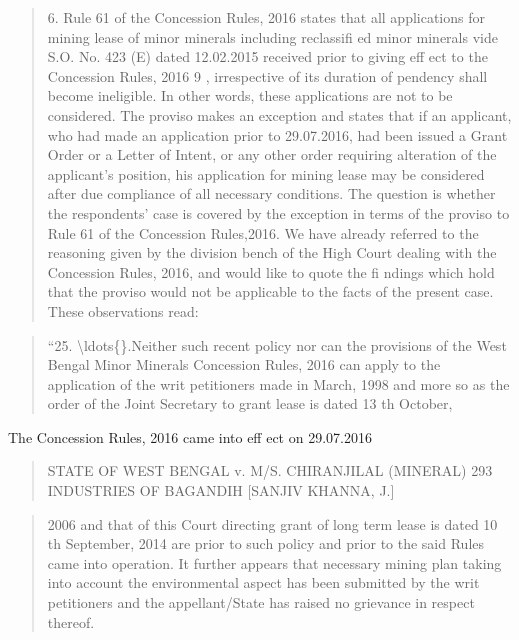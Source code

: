 \documentclass[12pt,a4paper]{article}
\newenvironment{judgequote}
  {\begin{quote}\small}
  {\end{quote}}
\begin{document}
\begin{judgequote}
6. Rule 61 of the Concession Rules, 2016 states that all applications
for mining lease of minor minerals including reclassifi ed minor minerals
vide S.O. No. 423 (E) dated 12.02.2015 received prior to giving eff ect
to the Concession Rules, 2016 9 , irrespective of its duration of pendency
shall become ineligible. In other words, these applications are not to be
considered. The proviso makes an exception and states that if an applicant,
who had made an application prior to 29.07.2016, had been issued a Grant
Order or a Letter of Intent, or any other order requiring alteration of the
applicant's position, his application for mining lease may be considered
after due compliance of all necessary conditions. The question is whether
the respondents' case is covered by the exception in terms of the proviso
to Rule 61 of the Concession Rules,2016. We have already referred to the
reasoning given by the division bench of the High Court dealing with the
Concession Rules, 2016, and would like to quote the fi ndings which hold
that the proviso would not be applicable to the facts of the present case.
These observations read:
\end{judgequote}

\begin{judgequote}
``25. \textbackslash{}ldots\{\}.Neither such recent policy nor can the provisions of the West
Bengal Minor Minerals Concession Rules, 2016 can apply to the
application of the writ petitioners made in March, 1998 and more so
as the order of the Joint Secretary to grant lease is dated 13 th October,
\end{judgequote}

 The Concession Rules, 2016 came into eff ect on 29.07.2016




\begin{judgequote}
STATE OF WEST BENGAL v. M/S. CHIRANJILAL (MINERAL) 293
INDUSTRIES OF BAGANDIH [SANJIV KHANNA, J.]
\end{judgequote}

\begin{judgequote}
2006 and that of this Court directing grant of long term lease is dated
10 th September, 2014 are prior to such policy and prior to the said
Rules came into operation. It further appears that necessary mining
plan taking into account the environmental aspect has been submitted
by the writ petitioners and the appellant/State has raised no grievance
in respect thereof.
\end{judgequote}
\end{document}
